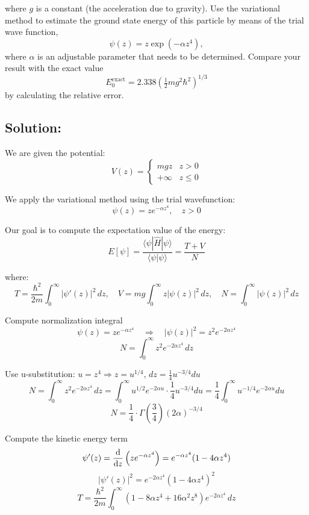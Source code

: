 \documentclass[12pt]{article}
\begin{document}
    where \( g \) is a constant (the acceleration due to gravity). Use the variational method to estimate the ground state energy of this particle by means of the trial wave function, 
    \[
        \psi(z) = z \exp(-\alpha z^4),
    \]
    where \( \alpha \) is an adjustable parameter that needs to be determined. Compare your result with the exact value 
    \[
        E_0^{\text{exact}} = 2.338 \left( \tfrac{1}{2}mg^2\hbar^2 \right)^{1/3}
    \]
    by calculating the relative error.

    \subsection{Solution:}
        We are given the potential:
        \[
            V(z) = 
            \begin{cases}
                mgz & z > 0 \\
                +\infty & z \leq 0
            \end{cases}
        \]
        
        We apply the variational method using the trial wavefunction:
        \[
            \psi(z) = z e^{-\alpha z^4}, \quad z > 0
        \]

        Our goal is to compute the expectation value of the energy:
        \[
            E[\psi] = \frac{\langle \psi | \hat{H} | \psi \rangle}{\langle \psi | \psi \rangle} = \frac{T + V}{N}
        \]

        where:
        \[
            T = \frac{\hbar^2}{2m} \int_0^\infty |\psi'(z)|^2 \, dz, \quad
            V = mg \int_0^\infty z |\psi(z)|^2 \, dz, \quad
            N = \int_0^\infty |\psi(z)|^2 \, dz
        \]

        Compute normalization integral
        \[
            \psi(z) = z e^{-\alpha z^4} \quad \Rightarrow \quad |\psi(z)|^2 = z^2 e^{-2\alpha z^4}
        \]
        \[
            N = \int_0^\infty z^2 e^{-2\alpha z^4} \, dz
        \]

        Use u-substitution: 
        \( 
            u = z^4 \Rightarrow z = u^{1/4}, \, dz = \frac{1}{4} u^{-3/4} du 
        \)
        \[
            N = \int_0^\infty z^2 e^{-2\alpha z^4} \, dz = \int_0^\infty u^{1/2} e^{-2\alpha u} \cdot \frac{1}{4} u^{-3/4} du = \frac{1}{4} \int_0^\infty u^{-1/4} e^{-2\alpha u} du
        \]
        \[
            N = \frac{1}{4} \cdot \Gamma\left(\frac{3}{4}\right)(2\alpha)^{-3/4}
        \]

        Compute the kinetic energy term
        \[
            \psi'(z) = \dv{z} \left(z e^{-\alpha z^4}\right) = e^{-\alpha z^4}(1 - 4\alpha z^4)
        \]
        \[
            |\psi'(z)|^2 = e^{-2\alpha z^4} (1 - 4\alpha z^4)^2
        \]
        \[
            T = \frac{\hbar^2}{2m} \int_0^\infty (1 - 8\alpha z^4 + 16\alpha^2 z^8) e^{-2\alpha z^4} \, dz
        \]
\end{document}
